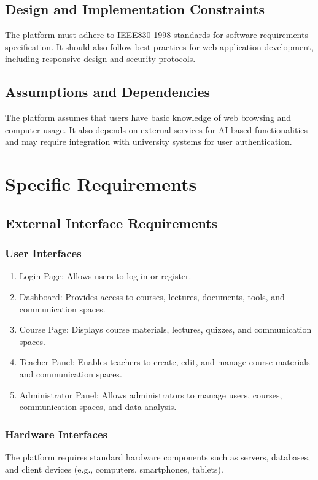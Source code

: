 \documentclass{IEEEtran}
\begin{document}
\subsection{Design and Implementation Constraints}
The platform must adhere to IEEE830-1998 standards for software requirements specification. It should also follow best practices for web application development, including responsive design and security protocols.

\subsection{Assumptions and Dependencies}
The platform assumes that users have basic knowledge of web browsing and computer usage. It also depends on external services for AI-based functionalities and may require integration with university systems for user authentication.

\section{Specific Requirements}

\subsection{External Interface Requirements}
\subsubsection{User Interfaces}
\begin{enumerate}[noitemsep]
\item Login Page: Allows users to log in or register.
\item Dashboard: Provides access to courses, lectures, documents, tools, and communication spaces.
\item Course Page: Displays course materials, lectures, quizzes, and communication spaces.
\item Teacher Panel: Enables teachers to create, edit, and manage course materials and communication spaces.
\item Administrator Panel: Allows administrators to manage users, courses, communication spaces, and data analysis.
\end{enumerate}

\subsubsection{Hardware Interfaces}
The platform requires standard hardware components such as servers, databases, and client devices (e.g., computers, smartphones, tablets).
\end{document}
